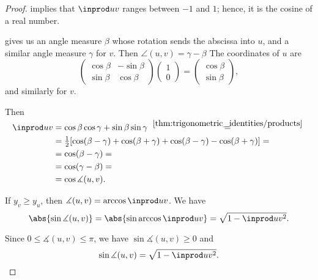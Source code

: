 \begin{proof}
   implies that \( \inprod u v \) ranges between \( -1 \) and \( 1 \); hence, it is the cosine of a real number.

   gives us an angle measure \( \beta \) whose rotation sends the abscissa into \( u \), and a similar angle measure \( \gamma \) for \( v \). Then \( \angle(u, v) = \gamma - \beta \) The coordinates of \( u \) are
  \begin{equation*}
    \begin{pmatrix}
      \cos \beta & -\sin \beta \\
      \sin \beta & \cos \beta
    \end{pmatrix}
    \begin{pmatrix}
      1 \\ 0
    \end{pmatrix}
    =
    \begin{pmatrix}
      \cos \beta \\ \sin \beta
    \end{pmatrix},
  \end{equation*}
  and similarly for \( v \).

  Then
  \begin{align*}
    \inprod u v
    &=
    \cos \beta \cos \gamma + \sin \beta \sin \gamma
    \reloset {\ref{thm:trigonometric_identities/products}} = \\ &=
    \tfrac 1 2 [\cos(\beta - \gamma) + \cos(\beta + \gamma) + \cos(\beta - \gamma) - \cos(\beta + \gamma)]
    = \\ &=
    \cos(\beta - \gamma)
    = \\ &=
    \cos(\gamma - \beta)
    = \\ &=
    \cos \measuredangle(u, v).
  \end{align*}

  If \( y_v \geq y_u \), then \( \measuredangle(u, v) = \arccos \inprod u v \). We have
  \begin{equation*}
    \abs{\sin \measuredangle(u, v)}
    =
    \abs{\sin \arccos \inprod u v}
    =
    \sqrt{1 - \inprod u v^2}.
  \end{equation*}

  Since \( 0 \leq \measuredangle(u, v) \leq \pi \), we have \( \sin \measuredangle(u, v) \geq 0 \) and
  \begin{equation*}
    \sin \measuredangle(u, v) = \sqrt{1 - \inprod u v^2}.
  \end{equation*}


\end{proof}
